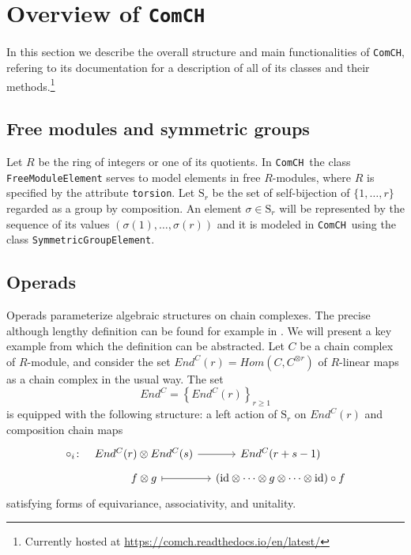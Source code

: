 \documentclass{amsart}
\renewcommand{\S}{\mathrm S}
\newcommand{\comch}{\texttt{ComCH}}
\newcommand{\id}{\mathrm{id}}
\begin{document}
\tableofcontents

\section{Overview of \comch} \label{s: overview}
In this section we describe the overall structure and main functionalities of \comch, refering to its documentation for a description of all of its classes and their methods.\footnote{Currently hosted at \url{https://comch.readthedocs.io/en/latest/}}

\subsection{Free modules and symmetric groups}

Let $R$ be the ring of integers or one of its quotients. In \comch\, the class \texttt{FreeModuleElement} serves to model elements in free $R$-modules, where $R$ is specified by the attribute \texttt{torsion}. Let $\S_r$ be the set of self-bijection of $\{1, \dots, r\}$ regarded as a group by composition. An element $\sigma \in \S_r$ will be represented by the sequence of its values $(\sigma(1), \dots, \sigma(r))$ and it is modeled in \comch\, using the class \texttt{SymmetricGroupElement}.

\subsection{Operads}

Operads parameterize algebraic structures on chain complexes. The precise although lengthy definition can be found for example in \cite{Markl08}. We will present a key example from which the definition can be abstracted. Let $C$ be a chain complex of $R$-module, and consider the set $End^C(r) = Hom(C, C^{\otimes r})$ of $R$-linear maps as a chain complex in the usual way. The set 
\begin{equation*}
End^C = \left\{End^C(r)\right\}_{r \geq 1}
\end{equation*}
is equipped with the following structure: a left action of $\S_r$ on $End^C(r)$ and composition chain maps
\begin{equation*}
\begin{tikzcd}[column sep=small, row sep=tiny]
\circ_i \colon &[-10pt] End^C(r) \otimes End^C(s) \arrow[r] & End^C(r+s-1) \\
& f \otimes g \arrow[r, |->] & (\id \otimes \cdots \otimes g \otimes \cdots \otimes \id) \circ f 
\end{tikzcd}
\end{equation*}
satisfying forms of equivariance, associativity, and unitality.
\end{document}
